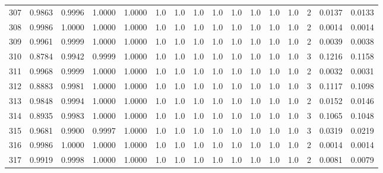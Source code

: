 \begin{tabular}{lrrrrrrrrrrrrrrr}
307 &      0.9863 &  0.9996 &  1.0000 &  1.0000 &     1.0 &     1.0 &     1.0 &     1.0 &     1.0 &     1.0 &      1.0 &        1.0 &      2 &                    0.0137 &                     0.0133 \\
308 &      0.9986 &  1.0000 &  1.0000 &  1.0000 &     1.0 &     1.0 &     1.0 &     1.0 &     1.0 &     1.0 &      1.0 &        1.0 &      2 &                    0.0014 &                     0.0014 \\
309 &      0.9961 &  0.9999 &  1.0000 &  1.0000 &     1.0 &     1.0 &     1.0 &     1.0 &     1.0 &     1.0 &      1.0 &        1.0 &      2 &                    0.0039 &                     0.0038 \\
310 &      0.8784 &  0.9942 &  0.9999 &  1.0000 &     1.0 &     1.0 &     1.0 &     1.0 &     1.0 &     1.0 &      1.0 &        1.0 &      3 &                    0.1216 &                     0.1158 \\
311 &      0.9968 &  0.9999 &  1.0000 &  1.0000 &     1.0 &     1.0 &     1.0 &     1.0 &     1.0 &     1.0 &      1.0 &        1.0 &      2 &                    0.0032 &                     0.0031 \\
312 &      0.8883 &  0.9981 &  1.0000 &  1.0000 &     1.0 &     1.0 &     1.0 &     1.0 &     1.0 &     1.0 &      1.0 &        1.0 &      3 &                    0.1117 &                     0.1098 \\
313 &      0.9848 &  0.9994 &  1.0000 &  1.0000 &     1.0 &     1.0 &     1.0 &     1.0 &     1.0 &     1.0 &      1.0 &        1.0 &      2 &                    0.0152 &                     0.0146 \\
314 &      0.8935 &  0.9983 &  1.0000 &  1.0000 &     1.0 &     1.0 &     1.0 &     1.0 &     1.0 &     1.0 &      1.0 &        1.0 &      3 &                    0.1065 &                     0.1048 \\
315 &      0.9681 &  0.9900 &  0.9997 &  1.0000 &     1.0 &     1.0 &     1.0 &     1.0 &     1.0 &     1.0 &      1.0 &        1.0 &      3 &                    0.0319 &                     0.0219 \\
316 &      0.9986 &  1.0000 &  1.0000 &  1.0000 &     1.0 &     1.0 &     1.0 &     1.0 &     1.0 &     1.0 &      1.0 &        1.0 &      2 &                    0.0014 &                     0.0014 \\
317 &      0.9919 &  0.9998 &  1.0000 &  1.0000 &     1.0 &     1.0 &     1.0 &     1.0 &     1.0 &     1.0 &      1.0 &        1.0 &      2 &                    0.0081 &                     0.0079 \\

\end{tabular}

